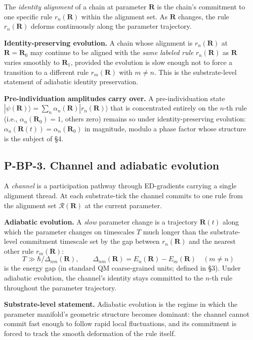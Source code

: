 \documentclass[11pt,a4paper]{article}
\begin{document}
The \emph{identity alignment} of a chain at parameter $\mathbf{R}$ is the chain's commitment to one specific rule $r_n(\mathbf{R})$ within the alignment set. As $\mathbf{R}$ changes, the rule $r_n(\mathbf{R})$ deforms continuously along the parameter trajectory.

\textbf{Identity-preserving evolution.} A chain whose alignment is $r_n(\mathbf{R})$ at $\mathbf{R} = \mathbf{R}_0$ may continue to be aligned with the \emph{same labeled rule} $r_n(\mathbf{R})$ as $\mathbf{R}$ varies smoothly to $\mathbf{R}_1$, provided the evolution is slow enough not to force a transition to a different rule $r_m(\mathbf{R})$ with $m \neq n$. This is the substrate-level statement of adiabatic identity preservation.

\textbf{Pre-individuation amplitudes carry over.} A pre-individuation state $|\psi(\mathbf{R})\rangle = \sum_n \alpha_n(\mathbf{R})|r_n(\mathbf{R})\rangle$ that is concentrated entirely on the $n$-th rule (i.e., $\alpha_n(\mathbf{R}_0) = 1$, others zero) remains so under identity-preserving evolution: $\alpha_n(\mathbf{R}(t)) = \alpha_n(\mathbf{R}_0)$ in magnitude, modulo a phase factor whose structure is the subject of \S4.

\subsection{P-BP-3. Channel and adiabatic evolution}

A \emph{channel} is a participation pathway through ED-gradients carrying a single alignment thread. At each substrate-tick the channel commits to one rule from the alignment set $\mathcal{R}(\mathbf{R})$ at the current parameter.

\textbf{Adiabatic evolution.} A \emph{slow} parameter change is a trajectory $\mathbf{R}(t)$ along which the parameter changes on timescales $T$ much longer than the substrate-level commitment timescale set by the gap between $r_n(\mathbf{R})$ and the nearest other rule $r_m(\mathbf{R})$:
\[
T \gg \hbar / \Delta_{nm}(\mathbf{R}), \qquad \Delta_{nm}(\mathbf{R}) = E_n(\mathbf{R}) - E_m(\mathbf{R}) \quad (m \neq n)
\]
is the energy gap (in standard QM coarse-grained units; defined in \S3). Under adiabatic evolution, the channel's identity stays committed to the $n$-th rule throughout the parameter trajectory.

\textbf{Substrate-level statement.} Adiabatic evolution is the regime in which the parameter manifold's geometric structure becomes dominant: the channel cannot commit fast enough to follow rapid local fluctuations, and its commitment is forced to track the smooth deformation of the rule itself.
\end{document}
